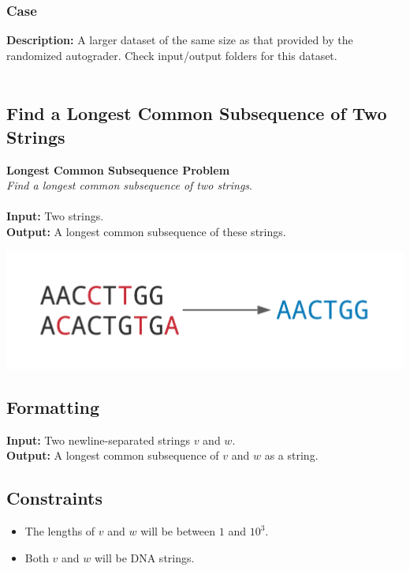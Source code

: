 \documentclass{article}
\begin{document}
\subsubsection*{Case }
\hline \vspace{5}
\textbf{Description:} A larger dataset of the same size as that provided by the randomized autograder. Check input/output folders for this dataset.\\ \\
\pagebreak

\subsection{Find a Longest Common Subsequence of Two Strings}
\hline\vspace{5}
\textbf{Longest Common Subsequence Problem}\\
\emph{Find a longest common subsequence of two strings}.\\ \\
\textbf{Input:} Two strings.\\
\textbf{Output:} A longest common subsequence of these strings.
\begin{center}
    \includegraphics[scale=0.24]{c5/logos/5C.png}
\end{center}
\hline\vspace{5}

\subsection*{Formatting}
\noindent\textbf{Input:} Two newline-separated strings $v$ and $w$.\\
\noindent\textbf{Output:} A longest common subsequence of $v$ and $w$ as a string.

\subsection*{Constraints}
\begin{itemize}
    \item The lengths of $v$ and $w$ will be between $1$ and $10^3$.
    \item Both $v$ and $w$ will be DNA strings.
\end{itemize}
\pagebreak
\end{document}
